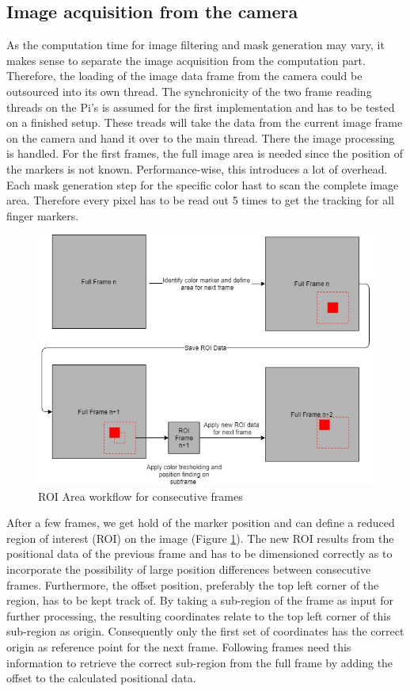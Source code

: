 \subsection{Image acquisition from the camera}
As the computation time for image filtering and mask generation may vary, it makes sense to separate the image acquisition from the computation part. Therefore, the loading of the image data frame from the camera could be outsourced into its own thread. The synchronicity of the two frame reading threads on the Pi's is assumed for the first implementation and has to be tested on a finished setup. These treads will take the data from the current image frame on the camera and hand it over to the main thread. There the image processing is handled. For the first frames, the full image area is needed since the position of the markers is not known. Performance-wise, this introduces a lot of overhead. Each mask generation step for the specific color hast to scan  the complete image area. Therefore every pixel has to be read out 5 times to get the tracking for all finger markers.
\begin{figure}[H]
\includegraphics[width=\textwidth]{images/ROI.jpg}
\caption{ROI Area workflow for consecutive frames}
\label{roi_calc} 
\end{figure}
After a few frames, we get hold of the marker position and can define a reduced region of interest (ROI) on the image (Figure \ref{roi_calc}). The new ROI results from the positional data of the previous frame and has to be dimensioned correctly as to incorporate the possibility of large position differences between consecutive frames.
Furthermore, the offset position, preferably the top left corner of the region, has to be kept track of. By taking a sub-region of the frame as input for further processing, the resulting coordinates relate to the top left corner of this sub-region as origin. Consequently only the first set of coordinates has the correct origin as reference point for the next frame. Following frames need this information to retrieve the correct sub-region from the full frame by adding the offset to the calculated positional data.
